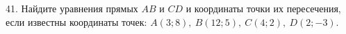 41. Найдите уравнения прямых $AB$ и $CD$ и координаты точки их пересечения, если известны координаты точек: $A(3;8),\ B(12;5),\ C(4;2),\ D(2;-3).$\\
